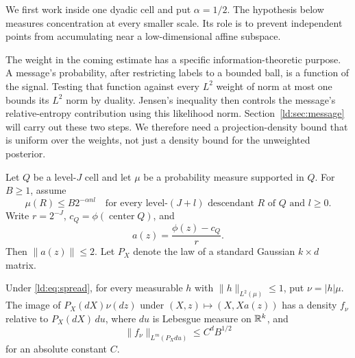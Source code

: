 We first work inside one dyadic cell and put $\alpha=1/2$. The hypothesis below measures
concentration at every smaller scale. Its role is to prevent independent
points from accumulating near a low-dimensional affine subspace.

The weight in the coming estimate has a specific information-theoretic
purpose. A message's probability, after restricting labels to a bounded
ball, is a function of the signal. Testing that function against every
$L^2$ weight of norm at most one bounds its $L^2$ norm by duality.
Jensen's inequality then controls the message's relative-entropy
contribution using this likelihood norm. Section~\ref{ld:sec:message}
will carry out these two steps. We therefore need a projection-density
bound that is uniform over the weights, not just a density bound for
the unweighted posterior.

Let $Q$ be a level-$J$ cell and let $\mu$ be a probability measure
supported in $Q$. For $B\ge1$, assume
\begin{equation}\label{ld:eq:spread}
 \mu(R)\le B2^{-\alpha n l}
 \quad\text{for every level-$(J+l)$ descendant $R$ of $Q$ and $l\ge0$}.
\end{equation}
Write $r=2^{-J}$, $c_Q=\phi(\operatorname{center}Q)$, and
\[
 a(z)=\frac{\phi(z)-c_Q}{r}.
\]
Then $\|a(z)\|\le2$. Let $P_X$ denote the law of a standard Gaussian
$k\times d$ matrix.

\begin{lemma}\label{ld:lem:density}
Under \eqref{ld:eq:spread}, for every measurable $h$ with
$\|h\|_{L^2(\mu)}\le1$, put $\nu=|h|\mu$. The image of
$P_X(dX)\nu(dz)$ under $(X,z)\mapsto(X,Xa(z))$ has a density
$f_\nu$ relative to $P_X(dX)\,du$, where $du$ is Lebesgue measure
on $\mathbb R^k$, and
\begin{equation}\label{ld:eq:density}
 \|f_\nu\|_{L^m(P_Xdu)}\le C^d B^{1/2}
\end{equation}
for an absolute constant $C$.
\end{lemma}

